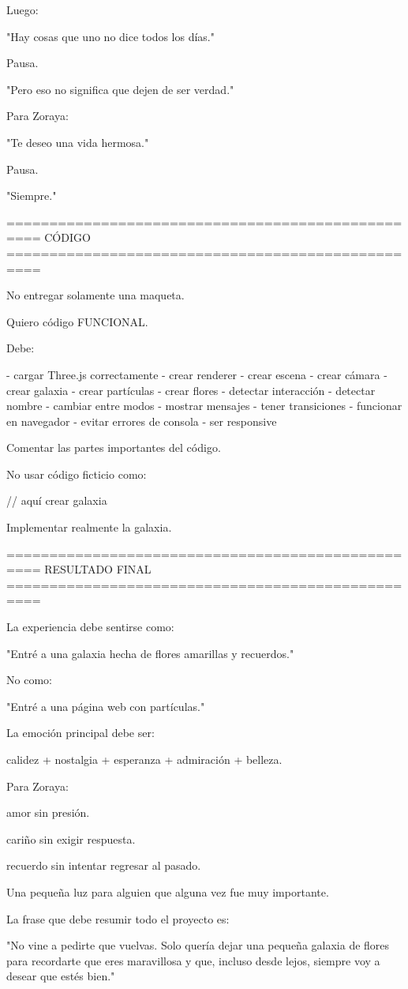 Luego:

"Hay cosas que uno no dice todos los días."

Pausa.

"Pero eso no significa que dejen de ser verdad."

Para Zoraya:

"Te deseo una vida hermosa."

Pausa.

"Siempre."

==================================================
CÓDIGO
==================================================

No entregar solamente una maqueta.

Quiero código FUNCIONAL.

Debe:

- cargar Three.js correctamente
- crear renderer
- crear escena
- crear cámara
- crear galaxia
- crear partículas
- crear flores
- detectar interacción
- detectar nombre
- cambiar entre modos
- mostrar mensajes
- tener transiciones
- funcionar en navegador
- evitar errores de consola
- ser responsive

Comentar las partes importantes del código.

No usar código ficticio como:

// aquí crear galaxia

Implementar realmente la galaxia.

==================================================
RESULTADO FINAL
==================================================

La experiencia debe sentirse como:

"Entré a una galaxia hecha de flores amarillas y recuerdos."

No como:

"Entré a una página web con partículas."

La emoción principal debe ser:

calidez + nostalgia + esperanza + admiración + belleza.

Para Zoraya:

amor sin presión.

cariño sin exigir respuesta.

recuerdo sin intentar regresar al pasado.

Una pequeña luz para alguien que alguna vez fue muy importante.

La frase que debe resumir todo el proyecto es:

"No vine a pedirte que vuelvas.
Solo quería dejar una pequeña galaxia de flores para recordarte que eres maravillosa y que, incluso desde lejos, siempre voy a desear que estés bien."

